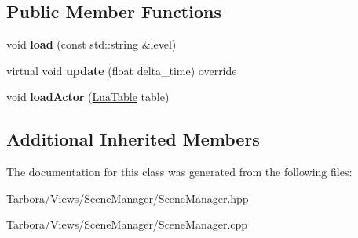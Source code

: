 \subsection*{Public Member Functions}
\begin{DoxyCompactItemize}
\item 
\mbox{\label{classTarbora_1_1SceneManager_a558b907267cd288421c0aebaa6d13d6f}} 
void {\bfseries load} (const std\+::string \&level)
\item 
\mbox{\label{classTarbora_1_1SceneManager_a6f7a03cf4124791e1fb42b55a9a014a2}} 
virtual void {\bfseries update} (float delta\+\_\+time) override
\item 
\mbox{\label{classTarbora_1_1SceneManager_af5e17574c3ede36a0c3f410c1e176e2c}} 
void {\bfseries load\+Actor} (\hyperlink{classTarbora_1_1LuaTable}{Lua\+Table} table)
\end{DoxyCompactItemize}
\subsection*{Additional Inherited Members}


The documentation for this class was generated from the following files\+:\begin{DoxyCompactItemize}
\item 
Tarbora/\+Views/\+Scene\+Manager/Scene\+Manager.\+hpp\item 
Tarbora/\+Views/\+Scene\+Manager/Scene\+Manager.\+cpp\end{DoxyCompactItemize}
